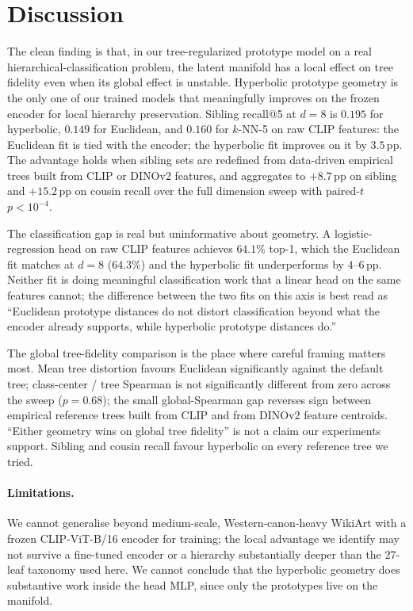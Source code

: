 \section{Discussion}
\label{sec:conclusion}

The clean finding is that, in our tree-regularized prototype model
on a real hierarchical-classification problem, the latent manifold
has a local effect on tree fidelity even when its global effect is
unstable. Hyperbolic prototype geometry is the only one of
our trained models that meaningfully improves on the frozen encoder
for local hierarchy preservation. Sibling recall@5 at $d{=}8$ is
$0.195$ for hyperbolic, $0.149$ for Euclidean, and $0.160$ for
$k$-NN-5 on raw CLIP features: the Euclidean fit is tied with the
encoder; the hyperbolic fit improves on it by
$3.5$\,pp. The advantage holds when sibling sets are redefined from
data-driven empirical trees built from CLIP or DINOv2 features, and
aggregates to $+8.7$\,pp on sibling and $+15.2$\,pp on cousin recall
over the full dimension sweep with paired-$t$ $p<10^{-4}$.

The classification gap is real but uninformative about geometry. A
logistic-regression head on raw CLIP features achieves $64.1\%$
top-1, which the Euclidean fit matches at $d{=}8$ ($64.3\%$) and
the hyperbolic fit underperforms by $4$--$6$\,pp. Neither fit is doing meaningful
classification work that a linear head on the same features cannot;
the difference between the two fits on this axis is best read as
``Euclidean prototype distances do not distort classification beyond
what the encoder already supports, while hyperbolic prototype
distances do.''

The global tree-fidelity comparison is the place where careful
framing matters most. Mean tree distortion favours Euclidean
significantly against the default tree; class-center / tree Spearman
is not significantly different from zero across the sweep
($p=0.68$); the small global-Spearman gap reverses sign between
empirical reference trees built from CLIP and from DINOv2 feature
centroids. ``Either geometry wins on global tree fidelity'' is not a
claim our experiments support. Sibling and cousin recall favour
hyperbolic on every reference tree we tried.

\paragraph{Limitations.} We cannot generalise beyond medium-scale,
Western-canon-heavy WikiArt with a frozen CLIP-ViT-B/16 encoder for
training; the local advantage we identify may not survive a
fine-tuned encoder or a hierarchy substantially deeper than the
$27$-leaf taxonomy used here. We cannot conclude that the hyperbolic
geometry does substantive work inside the head MLP, since only the
prototypes live on the manifold.

